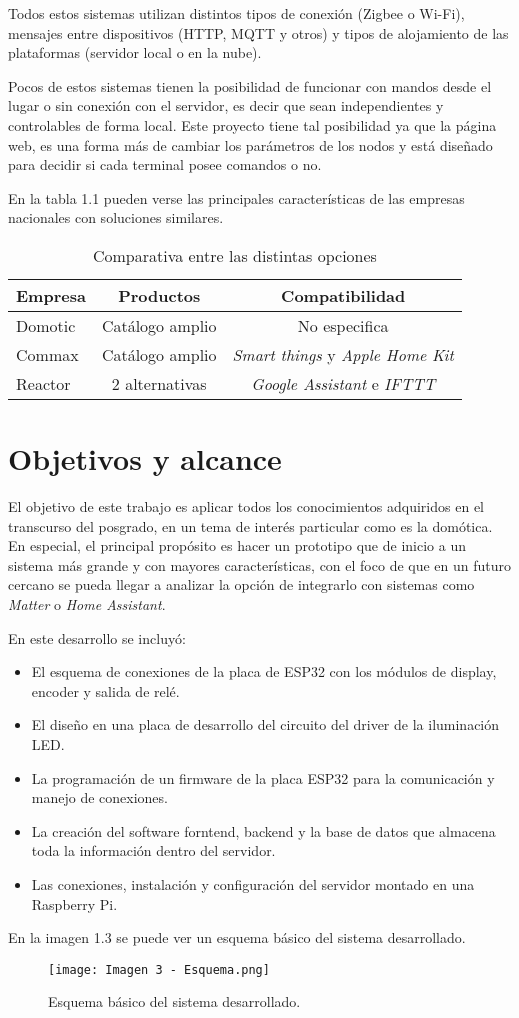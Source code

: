 Todos estos sistemas utilizan distintos tipos de conexión (Zigbee o Wi-Fi), mensajes entre dispositivos (HTTP, MQTT y otros) y tipos de alojamiento de las plataformas (servidor local o en la nube).

Pocos de estos sistemas tienen la posibilidad de funcionar con mandos desde el lugar o sin conexión con el servidor, es decir que sean independientes y controlables de forma local. Este proyecto tiene tal posibilidad ya que la página web, es una forma más de cambiar los parámetros de los nodos y está diseñado para decidir si cada terminal posee comandos o no.

En la tabla 1.1 pueden verse las principales características de las empresas nacionales con soluciones similares.

\begin{table}[h]
\centering
\caption[Mercado nacional]{Comparativa entre las distintas opciones}
\begin{tabular}{l c c}
\toprule
\textbf{Empresa} & \textbf{Productos} & \textbf{Compatibilidad}\\
\midrule
Domotic	& Catálogo amplio & No especifica \\
Commax	& Catálogo amplio & \textit{Smart things} y \textit{Apple Home Kit}	\\
Reactor	& 2 alternativas & \textit{Google Assistant} e \textit{IFTTT} \\
\bottomrule
\hline
\end{tabular}
\label{tab:peces}
\end{table}

\section{Objetivos y alcance}

El objetivo de este trabajo es aplicar todos los conocimientos adquiridos en el transcurso del posgrado, en un tema de interés particular como es la domótica. En especial, el principal propósito es hacer un prototipo que de inicio a un sistema más grande y con mayores características, con el foco de que en un futuro cercano se pueda llegar a analizar la opción de integrarlo con sistemas como \textit{Matter} o \textit{Home Assistant}.

En este desarrollo se incluyó:
\begin{itemize}
	\item El esquema de conexiones de la placa de ESP32 con los módulos de display, encoder y salida de relé.
	\item El diseño en una placa de desarrollo del circuito del driver de la iluminación LED.
	\item La programación de un firmware de la placa ESP32 para la comunicación y manejo de conexiones.
	\item La creación del software forntend, backend y la base de datos que almacena toda la información dentro del servidor.
	\item Las conexiones, instalación y configuración del servidor montado en una Raspberry Pi.
\end{itemize}

En la imagen 1.3 se puede ver un esquema básico del sistema desarrollado.
\begin{figure}[h]
\centering
\texttt{[image: Imagen 3 - Esquema.png]}
\caption[Esquema básico]{Esquema básico del sistema desarrollado.}
\label{fig:1}
\end{figure}